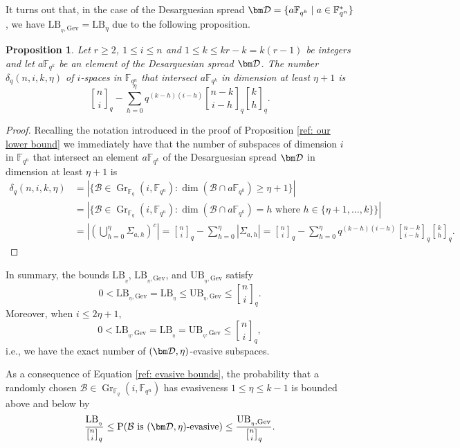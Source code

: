 \documentclass{article}
\newtheorem{proposition}{Proposition}
\newcommand{\Fq}{\mathbb{F}_{q}}
\newcommand{\Fqn}{\mathbb{F}_{q^n}}
\newcommand{\Fqk}{\mathbb{F}_{q^k}}
\newcommand{\calB}{\mathcal{B}}
\newcommand{\calD}{\mathcal{D}}
\newcommand{\gbinom}[2]{\genfrac{[}{]}{0pt}{}{#1}{#2}}
\DeclareMathOperator{\Gr}{Gr}
\begin{document}
It turns out that, in the case of the Desarguesian spread $\bm \calD= \{ a \Fqk \mid a \in \Fqn^* \}$, we have $\mathrm{LB}_{_{\eta},\mathrm{Gev}} = \mathrm{LB}_\eta$ due to the following proposition. 
\begin{proposition}
    Let $r\geq 2$, $1 \leq i \leq n$ and $1 \leq k \leq kr-k=k(r-1)$ be integers and let $a\Fqk$ be an element of the Desarguesian spread $\bm \calD$.
    \noindent The number $\delta_q(n,i,k,\eta)$ of $i$-spaces in $\Fqn$ that intersect $a\Fqk$ in dimension at least $\eta+1$ is
    \[
    \gbinom{n}{i}_q-\sum_{h=0}^\eta q^{(k-h)(i-h)}\gbinom{n-k}{i-h}_q\gbinom{k}{h}_q.
\]
\end{proposition}
\begin{proof}
    Recalling the notation introduced in the proof of Proposition \ref{ref: our lower bound} we immediately have that the number of subspaces of dimension $i$ in $\Fqn$ that intersect an element $a\Fqk$ of the Desarguesian spread $\bm \calD$ in dimension at least $\eta+1$ is
    \begin{align*}
    \delta_q(n,i,k,\eta)&=\left\lvert\{\calB \in  \Gr_{\Fq}(i,\Fqn) \colon \dim(\calB \cap a \Fqk)\geq \eta+1\}\right\rvert\\
    &=\left\lvert\{\calB \in  \Gr_{\Fq}(i,\Fqn) \colon \dim(\calB \cap a \Fqk)=h\text{ where }h\in\{\eta+1,\ldots,k\}\}\right\rvert\\
    &=\left\lvert \left(\bigcup_{h=0}^\eta\Sigma_{a,h}\right)^c\right\rvert=\gbinom{n}{i}_q-\sum_{h=0}^\eta\left\lvert\Sigma_{a,h}\right\rvert=\gbinom{n}{i}_q-\sum_{h=0}^\eta q^{(k-h)(i-h)}\gbinom{n-k}{i-h}_q\gbinom{k}{h}_q.
\end{align*}
\end{proof}
In summary, the bounds $\mathrm{LB}_{_{\eta}}$, $\mathrm{LB}_{_{\eta},\mathrm{Gev}}$, and $\mathrm{UB}_{_{\eta},\mathrm{Gev}}$ satisfy
\begin{equation}
    \label{ref: evasive bounds}
    0<\mathrm{LB}_{_{\eta},\mathrm{Gev}}=\mathrm{LB}_{_{\eta}}\leq \mathrm{UB}_{_{\eta},\mathrm{Gev}}\leq \gbinom{n}{i}_q. 
\end{equation}
Moreover, when $i \leq 2 \eta + 1$, 
\[
0<\mathrm{LB}_{_{\eta},\mathrm{Gev}}=\mathrm{LB}_{_{\eta}}= \mathrm{UB}_{_{\eta},\mathrm{Gev}}\leq \gbinom{n}{i}_q, 
\]
i.e., we have the exact number of $(\bm \calD, \eta)$-evasive subspaces.

As a consequence of Equation \ref{ref: evasive bounds}, the probability that a randomly chosen $\calB \in \Gr_{\Fq}(i,\Fqn)$ has evasiveness $1\leq \eta\leq k-1$ is bounded above and below by
\begin{equation}
    \label{eq: prob of being (D,eta) evasive}
    \frac{\mathrm{LB}_{_{\eta}}}{\gbinom{n}{i}_q}\leq  \mathrm{P}(\calB \text{ is } (\bm \calD,\eta)\text{-evasive})
\leq \frac{\mathrm{UB}_{_{\eta},\mathrm{Gev}}}{\gbinom{n}{i}_q}.
\end{equation}
\end{document}
